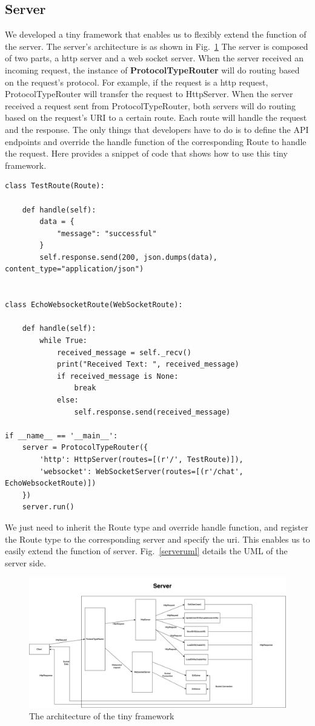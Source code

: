 \documentclass[11pt, oneside]{article}   	%
\begin{document}
\subsection{Server}
We developed a tiny framework that enables us to flexibly extend the function of the server. The server's architecture is as shown in Fig.~\ref{framework}
The server is composed of two parts, a http server and a web socket server. When the server received an incoming request, the instance of \textbf{ProtocolTypeRouter} will do routing based on the request's protocol. For example, if the request is a http request, ProtocolTypeRouter will transfer the request to HttpServer. When the server received a request sent from ProtocolTypeRouter, both servers will do routing based on the request's URI to a certain route. Each route will handle the request and the response. The only things that developers have to do is to define the API endpoints and override the handle function of the corresponding Route to handle the request.
Here provides a snippet of code that shows how to use this tiny framework.
\begin{verbatim}
class TestRoute(Route):

    def handle(self):
        data = {
            "message": "successful"
        }
        self.response.send(200, json.dumps(data), content_type="application/json")


class EchoWebsocketRoute(WebSocketRoute):

    def handle(self):
        while True:
            received_message = self._recv()
            print("Received Text: ", received_message)
            if received_message is None:
                break
            else:
                self.response.send(received_message)
                
if __name__ == '__main__':
    server = ProtocolTypeRouter({
        'http': HttpServer(routes=[(r'/', TestRoute)]),
        'websocket': WebSocketServer(routes=[(r'/chat', EchoWebsocketRoute)])
    })
    server.run()
\end{verbatim}
We just need to inherit the Route type and override handle function, and register the Route type to the corresponding server and specify the uri.
This enables us to easily extend the function of server. Fig.~\ref{serveruml} details the UML of the server side.

\begin{figure}[h]
\centering
\includegraphics[width=\textwidth]{framework}
\caption{The architecture of the tiny framework}
\label{framework}
\end{figure}
\end{document}
